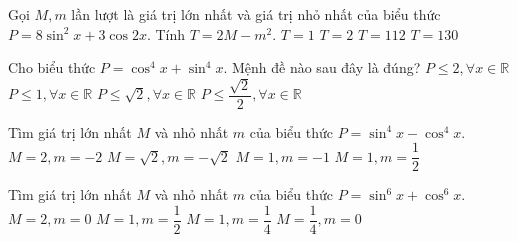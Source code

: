 \begin{ex}%
Gọi $M, m$ lần lượt là giá trị lớn nhất và giá trị nhỏ nhất của biểu thức $P=8\sin ^2x+3\cos 2x$. Tính $T=2M-m^2.$
\choice
{\True $T=1$}
{$T=2$}
{$T=112$}
{$T=130$}
\end{ex}

\begin{ex}%
Cho biểu thức $P=\cos ^4x+\sin ^4x$. Mệnh đề nào sau đây là đúng?
\choice
{$P\leqslant 2, \forall x\in \mathbb{R}$}
{\True $P\leqslant 1, \forall x\in \mathbb{R}$}
{$P\leqslant \sqrt{2}, \forall x\in \mathbb{R}$}
{$P\leqslant \dfrac{{\sqrt{2}}}{2}, \forall x\in \mathbb{R}$}
\end{ex}

\begin{ex}%
Tìm giá trị lớn nhất $M$ và nhỏ nhất $m$ của biểu thức $P=\sin ^4x-\cos ^4x.$
\choice
{$M=2, m=-2$}
{$M=\sqrt{2}, m=-\sqrt{2}$}
{\True $M=1, m=-1$}
{$M=1, m=\dfrac{1}{2}$}
\end{ex}

\begin{ex}%
Tìm giá trị lớn nhất $M$ và nhỏ nhất $m$ của biểu thức $P=\sin ^6x+\cos ^6x.$
\choice
{$M=2, m=0$}
{$M=1, m=\dfrac{1}{2}$}
{\True $M=1, m=\dfrac{1}{4}$}
{$M=\dfrac{1}{4}, m=0$}
\end{ex}

